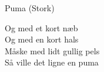 \begin{song}{Puma (Stork)}{}

  \begin{SBSection*}
    Og med et kort næb\\
    Og med en kort hals\\
    Måske med lidt gullig pels\\
    Så ville det ligne en puma
  \end{SBSection*}

  \begin{SBChorus}
  \end{SBChorus}


  \begin{SBSection*}
  \end{SBSection*}

\end{song}